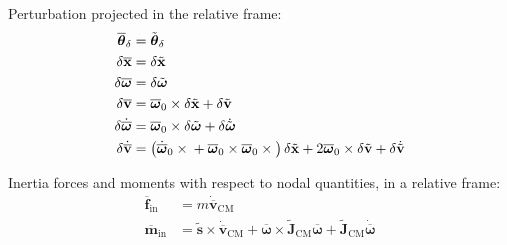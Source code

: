 \documentclass[10pt,dvips,fleqn,subeqn]{report}
\newcommand{\T}[1]{\bm{\mathbf{#1}}}
\newcommand{\TT}[1]{\bm{\mathbf{#1}}}
\begin{document}
Perturbation projected in the relative frame:
\begin{subequations}
\begin{align}
	\overline{\T{\theta}}_{\delta} &= \tilde{\T{\theta}}_{\delta} \\
	\delta\overline{\T{x}} &= \delta\tilde{\T{x}} \\
	\delta\overline{\T{\omega}} &= \delta\tilde{\T{\omega}} \\
	\delta\overline{\T{v}} &= \overline{\T{\omega}}_0 \times \delta\tilde{\T{x}}
		+ \delta\tilde{\T{v}} \\
	\delta\dot{\overline{\T{\omega}}} &= \overline{\T{\omega}}_0 \times \delta\tilde{\T{\omega}} 
		+ \delta\dot{\tilde{\T{\omega}}} \\
	\delta\dot{\overline{\T{v}}} &= \plbr{
			\dot{\overline{\T{\omega}}}_0 \times{}
			+ \overline{\T{\omega}}_0 \times \overline{\T{\omega}}_0 \times{}
		} \delta\tilde{\T{x}}
		+ 2 \overline{\T{\omega}}_0 \times \delta\tilde{\T{v}}
		+ \delta\dot{\tilde{\T{v}}}
\end{align}
\end{subequations}


Inertia forces and moments with respect to nodal quantities, in a relative frame:
\begin{subequations}
\begin{align}
	\overline{\T{f}}_{\text{in}}
	&= m \dot{\overline{\T{v}}}_{\text{CM}}
	\\
%
	\overline{\T{m}}_{\text{in}}
	&= \tilde{\T{s}}\times \dot{\overline{\T{v}}}_{\text{CM}}
	+ \overline{\T{\omega}} \times \tilde{\TT{J}}_{\text{CM}} \overline{\T{\omega}}
	+ \tilde{\TT{J}}_{\text{CM}} \dot{\overline{\T{\omega}}}
\end{align}
\end{subequations}
\end{document}
